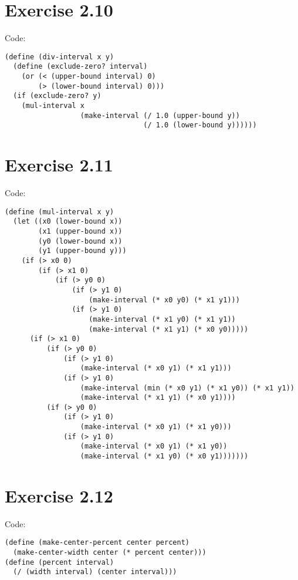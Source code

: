 \documentclass[../main.tex]{subfiles}
\begin{document}
\section{Exercise 2.10}

Code:

\begin{lstlisting}
(define (div-interval x y)
  (define (exclude-zero? interval)
    (or (< (upper-bound interval) 0)
        (> (lower-bound interval) 0)))
  (if (exclude-zero? y)
    (mul-interval x
                  (make-interval (/ 1.0 (upper-bound y))
                                 (/ 1.0 (lower-bound y))))))
\end{lstlisting}

\section{Exercise 2.11}

Code:

\begin{lstlisting}
(define (mul-interval x y)
  (let ((x0 (lower-bound x))
        (x1 (upper-bound x))
        (y0 (lower-bound x))
        (y1 (upper-bound y)))
    (if (> x0 0)
        (if (> x1 0)
            (if (> y0 0)
                (if (> y1 0)
                    (make-interval (* x0 y0) (* x1 y1)))
                (if (> y1 0)
                    (make-interval (* x1 y0) (* x1 y1))
                    (make-interval (* x1 y1) (* x0 y0)))))
      (if (> x1 0)
          (if (> y0 0)
              (if (> y1 0)
                  (make-interval (* x0 y1) (* x1 y1)))
              (if (> y1 0)
                  (make-interval (min (* x0 y1) (* x1 y0)) (* x1 y1))
                  (make-interval (* x1 y1) (* x0 y1))))
          (if (> y0 0)
              (if (> y1 0)
                  (make-interval (* x0 y1) (* x1 y0)))
              (if (> y1 0)
                  (make-interval (* x0 y1) (* x1 y0))
                  (make-interval (* x1 y0) (* x0 y1)))))))
\end{lstlisting}

\section{Exercise 2.12}

Code:

\begin{lstlisting}
(define (make-center-percent center percent)
  (make-center-width center (* percent center)))
(define (percent interval)
  (/ (width interval) (center interval)))
\end{lstlisting}
\end{document}
